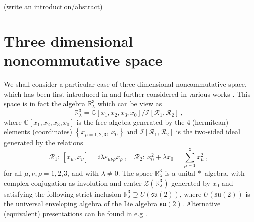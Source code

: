 \documentclass[11pt]{book}
\newcommand{\hilight}[1]{\colorbox{yellow!80!black}{#1}}
\newcommand{\Ical}{\mathcal{I}}
\newcommand{\Rcal}{\mathcal{R}}
\newcommand{\Zcal}{\mathcal{Z}}
\newcommand{\Cbb}{\mathbb{C}}
\newcommand{\Rbb}{\mathbb{R}}
\theoremstyle{break}
\begin{document}
\bigskip


\hilight{(write an introduction/abstract)}


\section*{Three dimensional noncommutative space}


We shall consider a particular case of three dimensional noncommutative space, which has been first introduced in \cite{hammou_coherent_2002} and further considered in various works \cite{gracia-bondia_infinitely_2002,vitale_noncommutative_2013,gere_quantum_2014}. This space is in fact the algebra $\Rbb^3_\lambda$ which can be view as \cite{vitale_noncommutative_2013,gere_quantum_2014}
%
\begin{equation*}
\Rbb^3_\lambda = \Cbb \left[x_1,x_2,x_3,x_0\right] / \Ical\left[\Rcal_1,\Rcal_2\right] \ , 
\end{equation*}
%
where $\Cbb\left[x_1,x_2,x_3,x_0\right]$ is the free algebra generated by the 4 (hermitean) elements (coordinates) $\left\{x_{\mu=1,2,3},\ x_0\right\}$ and $\Ical\left[\Rcal_1,\Rcal_2\right]$ is the two-sided ideal generated by the relations
%
\begin{equation*}
\Rcal_1: \ [x_\mu,x_\nu] = i \lambda \varepsilon_{\mu\nu\rho} x_\rho \ , \quad
\Rcal_2: \ x_0^2 + \lambda x_0 = \sum_{\mu=1}^3 x_\mu^2 \ , 
\end{equation*}
%
for all $\mu,\nu,\rho=1,2,3$, and with $\lambda\neq0$. The space $\Rbb^3_\lambda$ is a unital $*$--algebra, with complex conjugation as involution and center $\Zcal(\Rbb^3_\lambda)$ generated by $x_0$ and satisfying the following strict inclusion $\mathbb{R}^3_\lambda\supsetneq U(\mathfrak{su}(2))$, where $U(\mathfrak{su}(2))$ is the universal enveloping algebra of the Lie algebra ${\mathfrak{su}}(2)$. Alternative (equivalent) presentations can be found in e.g \cite{gracia-bondia_infinitely_2002,vitale_noncommutative_2013,gere_quantum_2014}.


\bigskip
\end{document}
